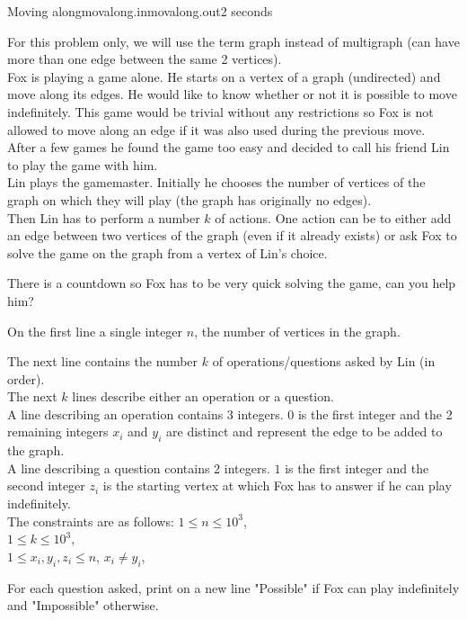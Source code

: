 \begin{problem}{Moving along}{movalong.in}{movalong.out}{2 seconds}


For this problem only, we will use the term graph instead of multigraph (can have more than one edge between the same 2 vertices).\\ 
Fox is playing a game alone. He starts on a vertex of a graph (undirected) and move along its edges. He would like to know whether or not it is possible to move indefinitely.
This game would be trivial without any restrictions so Fox is not allowed to move along an edge if it was also used during the previous move.\\ 
After a few games he found the game too easy and decided to call his friend Lin to play the game with him.\\ 
Lin plays the gamemaster. 
Initially he chooses the number of vertices of the graph on which they will play (the graph has originally no edges).\\ 
Then Lin has to perform a number $k$ of actions.
One action can be to either add an edge between two vertices of the graph (even if it already exists) or ask Fox to solve the game on the graph from a vertex of Lin's choice.

There is a countdown so Fox has to be very quick solving the game, can you help him?

\InputFile

On the first line a single integer $n$, the number of vertices in the graph.

The next line contains the number $k$ of operations/questions asked by Lin (in order).\\ 
The next $k$ lines describe either an operation or a question.\\ 
A line describing an operation contains 3 integers. $0$ is the first integer and the 2 remaining integers $x_i$ and $y_i$ are distinct and represent the edge to be added to the graph.\\ 
A line describing a question contains 2 integers. $1$ is the first integer and the second integer $z_i$ is the starting vertex at which Fox has to answer if he can play indefinitely.\\ 

The constraints are as follows:
$1\le n \le 10^3$,\\ 
$1\le k \le 10^3$,\\ 
$1\le x_i,y_i,z_i \le n$, $x_i\not=y_i$,\\ 

\OutputFile

For each question asked, print on a new line "Possible" if Fox can play indefinitely and "Impossible" otherwise.

\Example

\begin{examplewide}
%
\end{examplewide}

\end{problem}
